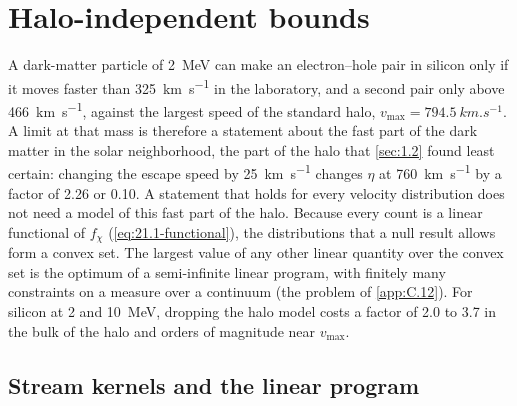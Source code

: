 \section{Halo-independent bounds}\label{sec:21.2}

A dark-matter particle of \SI{2}{MeV} can make an electron--hole pair in silicon only if it moves faster than \SI{325}{km.s^{-1}} in the laboratory, and a second pair only above \SI{466}{km.s^{-1}}, against the largest speed of the standard halo, $v_{\mathrm{max}} = \SI{794.5}{km.s^{-1}}$. A limit at that mass is therefore a statement about the fast part of the dark matter in the solar neighborhood, the part of the halo that \cref{sec:1.2} found least certain: changing the escape speed by \SI{25}{km.s^{-1}} changes $\eta$ at \SI{760}{km.s^{-1}} by a factor of 2.26 or 0.10. A statement that holds for every velocity distribution does not need a model of this fast part of the halo. Because every count is a linear functional of $f_\chi$ (\cref{eq:21.1-functional}), the distributions that a null result allows form a convex set. The largest value of any other linear quantity over the convex set is the optimum of a semi-infinite linear program, with finitely many constraints on a measure over a continuum (the problem of \cref{app:C.12}). For silicon at 2 and \SI{10}{MeV}, dropping the halo model costs a factor of 2.0 to 3.7 in the bulk of the halo and orders of magnitude near $v_{\mathrm{max}}$.

\subsection{Stream kernels and the linear program}\label{sec:21.2-program}

